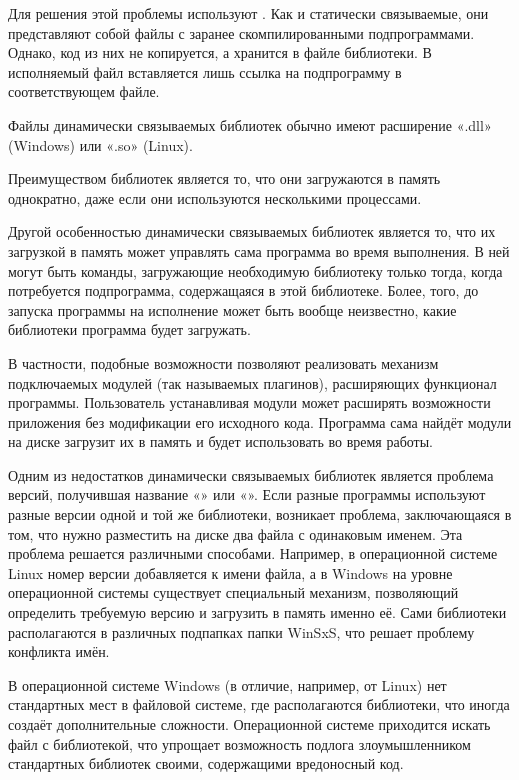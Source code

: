 
Для решения этой проблемы используют .  Как и статически
связываемые, они представляют собой файлы с заранее скомпилированными
подпрограммами. Однако, код из них не копируется, а хранится в файле
библиотеки. В исполняемый файл вставляется лишь ссылка на подпрограмму
в соответствующем файле.

Файлы динамически связываемых библиотек обычно имеют расширение «.dll»
(Windows) или «.so» (Linux).

Преимуществом библиотек является то, что они загружаются в память
однократно, даже если они используются несколькими процессами.

Другой особенностью динамически связываемых библиотек является то, что
их загрузкой в память может управлять сама программа во время
выполнения. В ней могут быть команды, загружающие необходимую
библиотеку только тогда, когда потребуется подпрограмма, содержащаяся
в этой библиотеке.  Более, того, до запуска программы на исполнение
может быть вообще неизвестно, какие библиотеки программа будет
загружать.

В частности, подобные возможности позволяют реализовать механизм
подключаемых модулей (так называемых плагинов), расширяющих
функционал программы.  Пользователь устанавливая модули может
расширять возможности приложения без модификации его исходного
кода. Программа сама найдёт модули на диске загрузит их в память и
будет использовать во время работы.


Одним из недостатков динамически связываемых библиотек является
проблема версий, получившая название «» или
«». Если разные программы
используют разные версии одной и той же библиотеки, возникает
проблема, заключающаяся в том, что нужно разместить на диске два файла
с одинаковым именем. Эта проблема решается различными
способами. Например, в операционной системе Linux номер версии
добавляется к имени файла, а в Windows на уровне операционной системы
существует специальный механизм, позволяющий определить требуемую
версию и загрузить в память именно её. Сами библиотеки располагаются в
различных подпапках папки WinSxS, что решает проблему конфликта имён.

В операционной системе Windows (в отличие, например, от Linux) нет
стандартных мест в файловой системе, где располагаются библиотеки, что
иногда создаёт дополнительные сложности. Операционной системе
приходится искать файл с библиотекой, что упрощает возможность подлога
злоумышленником стандартных библиотек своими, содержащими вредоносный
код.

